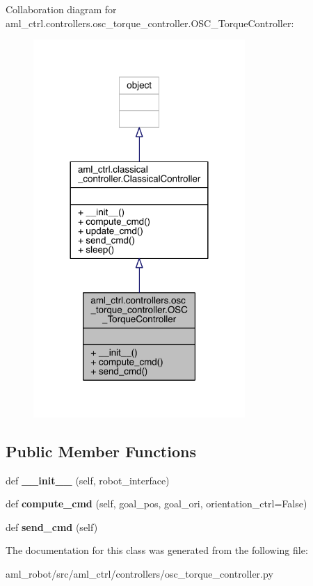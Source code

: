 Collaboration diagram for aml\+\_\+ctrl.\+controllers.\+osc\+\_\+torque\+\_\+controller.\+O\+S\+C\+\_\+\+Torque\+Controller\+:
\nopagebreak
\begin{figure}[H]
\begin{center}
\leavevmode
\includegraphics[width=228pt]{classaml__ctrl_1_1controllers_1_1osc__torque__controller_1_1_o_s_c___torque_controller__coll__graph}
\end{center}
\end{figure}
\subsection*{Public Member Functions}
\begin{DoxyCompactItemize}
\item 
\hypertarget{classaml__ctrl_1_1controllers_1_1osc__torque__controller_1_1_o_s_c___torque_controller_af8968b14f9ff120ae0d3ec3683871efa}{}\label{classaml__ctrl_1_1controllers_1_1osc__torque__controller_1_1_o_s_c___torque_controller_af8968b14f9ff120ae0d3ec3683871efa} 
def {\bfseries \+\_\+\+\_\+init\+\_\+\+\_\+} (self, robot\+\_\+interface)
\item 
\hypertarget{classaml__ctrl_1_1controllers_1_1osc__torque__controller_1_1_o_s_c___torque_controller_aab342800c6930d53833c67ea1b05798f}{}\label{classaml__ctrl_1_1controllers_1_1osc__torque__controller_1_1_o_s_c___torque_controller_aab342800c6930d53833c67ea1b05798f} 
def {\bfseries compute\+\_\+cmd} (self, goal\+\_\+pos, goal\+\_\+ori, orientation\+\_\+ctrl=False)
\item 
\hypertarget{classaml__ctrl_1_1controllers_1_1osc__torque__controller_1_1_o_s_c___torque_controller_a2c4085b111ce0db1b63f3883caac977a}{}\label{classaml__ctrl_1_1controllers_1_1osc__torque__controller_1_1_o_s_c___torque_controller_a2c4085b111ce0db1b63f3883caac977a} 
def {\bfseries send\+\_\+cmd} (self)
\end{DoxyCompactItemize}


The documentation for this class was generated from the following file\+:\begin{DoxyCompactItemize}
\item 
aml\+\_\+robot/src/aml\+\_\+ctrl/controllers/osc\+\_\+torque\+\_\+controller.\+py\end{DoxyCompactItemize}
